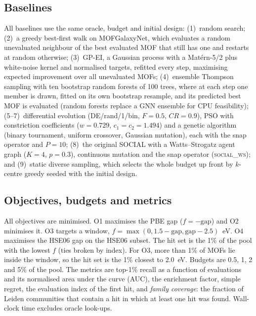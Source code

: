 \subsection{Baselines}
\label{sec:baselines}
All baselines use the same oracle, budget and initial design: (1)~random search; (2)~a greedy best-first walk on MOFGalaxyNet, which evaluates a random unevaluated neighbour of the best evaluated MOF that still has one and restarts at random otherwise; (3)~GP-EI, a Gaussian process with a Mat\'ern-5/2 plus white-noise kernel and normalised targets, refitted every step, maximising expected improvement \citep{jones1998ego,rasmussen2006gp} over all unevaluated MOFs; (4)~ensemble Thompson sampling with ten bootstrap random forests \citep{breiman2001rf} of 100 trees, where at each step one member is drawn, fitted on its own bootstrap resample, and its predicted best MOF is evaluated (random forests replace a GNN ensemble for CPU feasibility); (5--7)~differential evolution \citep{storn1997de} (DE/rand/1/bin, $F=0.5$, $CR=0.9$), PSO with constriction coefficients \citep{kennedy1995pso,clerc2002pso} ($w=0.729$, $c_1=c_2=1.494$) and a genetic algorithm \citep{holland1975adaptation} (binary tournament, uniform crossover, Gaussian mutation), each with the snap operator and $P=10$; (8)~the original SOCIAL with a Watts--Strogatz agent graph ($K=4$, $p=0.3$), continuous mutation and the snap operator (\textsc{social\_ws}); and (9)~static diverse sampling, which selects the whole budget up front by $k$-centre greedy \citep{sener2018coreset} seeded with the initial design.

\subsection{Objectives, budgets and metrics}
\label{sec:metrics}
All objectives are minimised. O1 maximises the PBE gap ($f=-\mathrm{gap}$) and O2 minimises it. O3 targets a window, $f=\max(0,1.5-\mathrm{gap},\mathrm{gap}-2.5)$~eV. O4 maximises the HSE06 gap on the HSE06 subset. The hit set is the 1\% of the pool with the lowest $f$ (ties broken by index). For O3, more than 1\% of MOFs lie inside the window, so the hit set is the 1\% closest to 2.0~eV. Budgets are 0.5, 1, 2 and 5\% of the pool. The metrics are top-1\% recall as a function of evaluations and its normalised area under the curve (AUC), the enrichment factor, simple regret, the evaluation index of the first hit, and \emph{family coverage}: the fraction of Leiden communities that contain a hit in which at least one hit was found. Wall-clock time excludes oracle look-ups.

